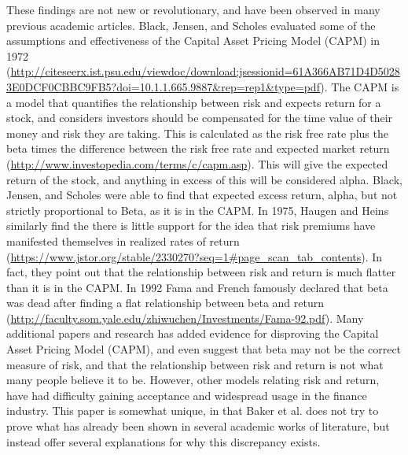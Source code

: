 \documentclass[12pt,twoside]{reedthesis}
\theoremstyle{definition}
\theoremstyle{definition}
\theoremstyle{definition}
\theoremstyle{remark}
\begin{document}
These findings are not new or revolutionary, and have been observed in
many previous academic articles. Black, Jensen, and Scholes evaluated
some of the assumptions and effectiveness of the Capital Asset Pricing
Model (CAPM) in 1972
(\url{http://citeseerx.ist.psu.edu/viewdoc/download;jsessionid=61A366AB71D4D50283E0DCF0CBBC9FB5?doi=10.1.1.665.9887\&rep=rep1\&type=pdf}).
The CAPM is a model that quantifies the relationship between risk and
expects return for a stock, and considers investors should be
compensated for the time value of their money and risk they are taking.
This is calculated as the risk free rate plus the beta times the
difference between the risk free rate and expected market return
(\url{http://www.investopedia.com/terms/c/capm.asp}). This will give the
expected return of the stock, and anything in excess of this will be
considered alpha. Black, Jensen, and Scholes were able to find that
expected excess return, alpha, but not strictly proportional to Beta, as
it is in the CAPM. In 1975, Haugen and Heins similarly find the there is
little support for the idea that risk premiums have manifested
themselves in realized rates of return
(\url{https://www.jstor.org/stable/2330270?seq=1\#page_scan_tab_contents}).
In fact, they point out that the relationship between risk and return is
much flatter than it is in the CAPM. In 1992 Fama and French famously
declared that beta was dead after finding a flat relationship between
beta and return
(\url{http://faculty.som.yale.edu/zhiwuchen/Investments/Fama-92.pdf}).
Many additional papers and research has added evidence for disproving
the Capital Asset Pricing Model (CAPM), and even suggest that beta may
not be the correct measure of risk, and that the relationship between
risk and return is not what many people believe it to be. However, other
models relating risk and return, have had difficulty gaining acceptance
and widespread usage in the finance industry. This paper is somewhat
unique, in that Baker et al. does not try to prove what has already been
shown in several academic works of literature, but instead offer several
explanations for why this discrepancy exists.
\end{document}
